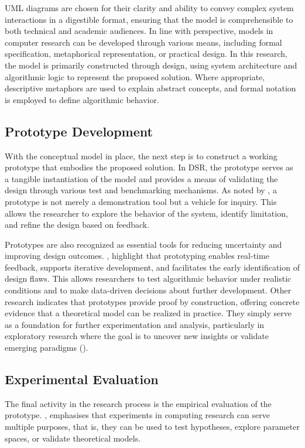 \noindent UML diagrams are chosen for their clarity and ability to convey complex system interactions in a digestible format, ensuring that the model is comprehensible to both technical and academic audiences. In line with \cite{olivier2009information} perspective, models in computer research can be developed through various means, including formal specification, metaphorical representation, or practical design. In this research, the model is primarily constructed through design, using system architecture and algorithmic logic to represent the proposed solution. Where appropriate, descriptive metaphors are used to explain abstract concepts, and formal notation is employed to define algorithmic behavior.

\subsection{Prototype Development}
With the conceptual model in place, the next step is to construct a working prototype that embodies the proposed solution. In DSR, the prototype serves as a tangible instantiation of the model and provides a means of validating the design through various test and benchmarking mechanisms. As noted by \cite{olivier2009information}, a prototype is not merely a demonstration tool but a vehicle for inquiry. This allows the researcher to explore the behavior of the system, identify limitation, and refine the design based on feedback. \bigskip

\noindent Prototypes are also recognized as essential tools for reducing uncertainty and improving design outcomes. \cite{camburn2017design}, highlight that prototyping enables real-time feedback, supports iterative development, and facilitates the early identification of design flaws. This allows researchers to test algorithmic behavior under realistic conditions and to make data-driven decisions about further development. Other research indicates that prototypes provide proof by construction, offering concrete evidence that a theoretical model can be realized in practice. They simply serve as a foundation for further experimentation and analysis, particularly in exploratory research where the goal is to uncover new insights or validate emerging paradigms (\cite{nunamaker1990systems}).

\subsection{Experimental Evaluation}
The final activity in the research process is the empirical evaluation of the prototype. \cite{olivier2009information}, emphasises that experiments in computing research can serve multiple purposes, that is, they can be used to test hypotheses, explore parameter spaces, or validate theoretical models. \bigskip

